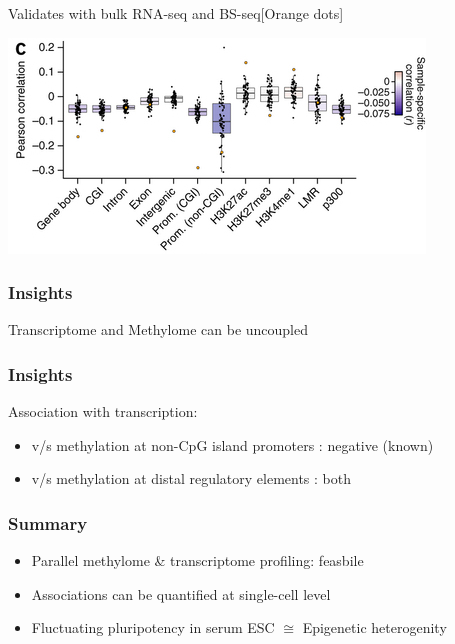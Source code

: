 \documentclass[10pt, compress]{beamer}
\renewcommand{\(}{\begin{columns}}
\renewcommand{\)}{\end{columns}}
\newcommand{\<}[1]{\begin{column}{#1}}
\renewcommand{\>}{\end{column}}
\begin{document}
\begin{frame}
	Validates with bulk RNA-seq and BS-seq[Orange dots]
	\begin{center}
		\includegraphics[width=\linewidth,height=\textheight,keepaspectratio]{images/corr2}
	\end{center}
\end{frame}

\begin{frame}[fragile]
	\frametitle{Insights}
	
 	\centering \large Transcriptome and Methylome can be uncoupled
	
\end{frame}

\begin{frame}[fragile]
		\frametitle{Insights}
Association with transcription: \begin{itemize}
	\item v/s methylation at non-CpG island promoters : negative (known)
	\item v/s methylation at distal regulatory elements : both
\end{itemize}
\end{frame}



\begin{frame}[fragile]
	\frametitle{Summary}
\begin{itemize}
		\item Parallel methylome \& transcriptome profiling: feasbile
		\item Associations can be quantified at single-cell level
		\item Fluctuating pluripotency in serum ESC $\cong$ Epigenetic heterogenity
	\end{itemize}
\end{frame}
\end{document}
